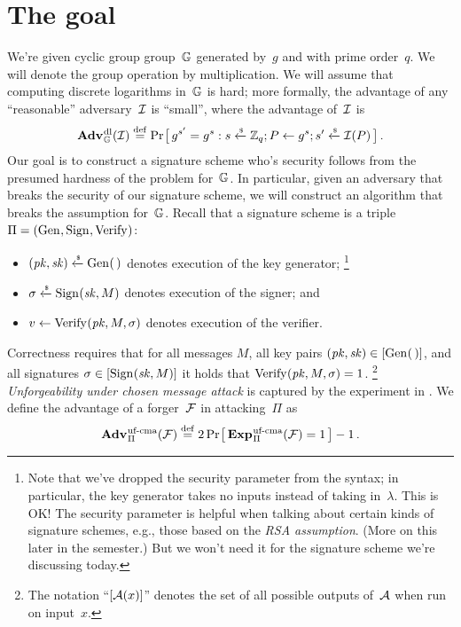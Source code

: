\documentclass{article}
\title{\thetitle}
\author{Christopher Patton, cjpatton@ufl.edu}
\date{2018/4/16, CIS 5371, Spring 2019, University of Florida}
\newcounter{foot}
\theoremstyle{remark}
\begin{document}
\maketitle

\begin{abstract}
  \noindent
  An overview of the Schnorr signature scheme and its security. The widely-used
  EdDSA scheme is based on Schnorr, and the underlying theory is used to
  construct efficient \emph{zero-knowledge proof systems}, which have a ton of
  interesting applications (e.g., cryptocurrencies).
  These notes are derived from Boneh-Shoup's book \emph{A Graduate Course in
  Applied Cryptography}, available on line at
  \url{https://crypto.stanford.edu/~dabo/cryptobook/}.
\end{abstract}

\section{The goal}

We're given cyclic group group~$\mathbb{G}$ generated by~$g$ and with prime order~$q$.
We will denote the group operation by multiplication.
%
We will assume that computing discrete logarithms in~$\mathbb{G}$ is hard; more
formally, the \dl advantage of any ``reasonable'' adversary~$\mathcal{I}$ is ``small'',
where the \dl advantage of~$\mathcal{I}$ is
%
\[
  \Adv{\dl}_\G(\I) \bydef
    \Prob{
      g^{s'} = g^{s} :
        s \getsr \Z_q; P \gets g^s; s' \getsr \I(P)
    }\,.
\]
%
Our goal is to construct a signature scheme who's security follows from the
presumed hardness of the \dl problem for~$\mathbb{G}$. In particular, given an adversary
that breaks the \ufcma security of our signature scheme, we will construct an
algorithm that breaks the \dl assumption for~$\mathbb{G}$.
%
Recall that a signature scheme is a triple $\Pi = (\textnormal{Gen}\hspace{0.33pt},\textnormal{Sign}\hspace{0.33pt},\textnormal{Verify}\hspace{0.33pt})$:
\begin{itemize}
  \item $(\mathit{pk}, \mathit{sk}) \xleftarrow{\text{\tiny{\$}}} \textnormal{Gen}\hspace{0.33pt}(\,)$ denotes execution of the key
    generator;%
    \footnote{Note that we've dropped the security parameter from the syntax; in
    particular, the key generator takes no inputs instead of taking
    in~$\lambda$. This is OK! The security parameter is helpful when talking
    about certain kinds of signature schemes, e.g., those based on the \emph{RSA
    assumption}. (More on this later in the semester.) But we won't need it for
    the signature scheme we're discussing today.}
  \item $\sigma \xleftarrow{\text{\tiny{\$}}} \textnormal{Sign}\hspace{0.33pt}(\mathit{sk}, M)$ denotes execution of the signer; and
  \item $v \gets \textnormal{Verify}\hspace{0.33pt}(\mathit{pk}, M, \sigma)$ denotes execution of the verifier.
\end{itemize}
%
Correctness requires that for all messages $M$, all key pairs
$(\mathit{pk},\mathit{sk})\in[\textnormal{Gen}\hspace{0.33pt}(\,)]$, and all signatures $\sigma\in[\textnormal{Sign}\hspace{0.33pt}(\mathit{sk},M)]$ it holds
that $\textnormal{Verify}\hspace{0.33pt}(\mathit{pk}, M, \sigma)=1$.%
%
\footnote{The notation ``$[\mathcal{A}(x)]$'' denotes the set of all possible
outputs of~$\mathcal{A}$ when run on input~$x$.} %
%
\emph{Unforgeability under chosen message attack} is captured by the \ufcma
experiment in . We define the advantage of a forger~$\mathcal{F}$ in
attacking~$\Pi$ as
%
\[
  \Adv{\ufcma}_{\Pi}(\F) \bydef 2\Prob{\Exp{\ufcma}_{\Pi}(\F)=1}-1 \,.
\]
\end{document}
